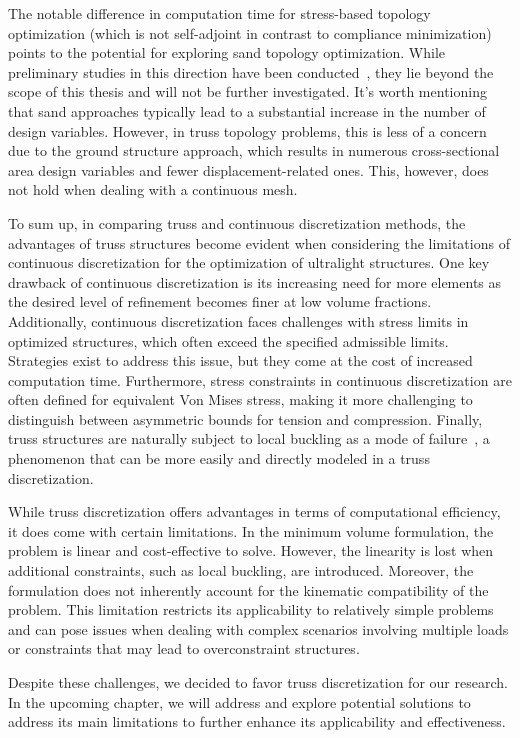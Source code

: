 The notable difference in computation time for stress-based topology optimization (which is not self-adjoint in contrast to compliance minimization) points to the potential for exploring \gls{sand} topology optimization. While preliminary studies in this direction have been conducted~, they lie beyond the scope of this thesis and will not be further investigated. It's worth mentioning that \gls{sand} approaches typically lead to a substantial increase in the number of design variables. However, in truss topology problems, this is less of a concern due to the ground structure approach, which results in numerous cross-sectional area design variables and fewer displacement-related ones. This, however, does not hold when dealing with a continuous mesh.

To sum up, in comparing truss and continuous discretization methods, the advantages of truss structures become evident when considering the limitations of continuous discretization for the optimization of ultralight structures. One key drawback of continuous discretization is its increasing need for more elements as the desired level of refinement becomes finer at low volume fractions. Additionally, continuous discretization faces challenges with stress limits in optimized structures, which often exceed the specified admissible limits. Strategies exist to address this issue, but they come at the cost of increased computation time. Furthermore, stress constraints in continuous discretization are often defined for equivalent Von Mises stress, making it more challenging to distinguish between asymmetric bounds for tension and compression. Finally, truss structures are naturally subject to local buckling as a mode of failure~, a phenomenon that can be more easily and directly modeled in a truss discretization. 

While truss discretization offers advantages in terms of computational efficiency, it does come with certain limitations. In the minimum volume formulation, the problem is linear and cost-effective to solve. However, the linearity is lost when additional constraints, such as local buckling, are introduced. Moreover, the formulation does not inherently account for the kinematic compatibility of the problem. This limitation restricts its applicability to relatively simple problems and can pose issues when dealing with complex scenarios involving multiple loads or constraints that may lead to overconstraint structures.

Despite these challenges, we decided to favor truss discretization for our research. In the upcoming chapter, we will address and explore potential solutions to address its main limitations to further enhance its applicability and effectiveness.

